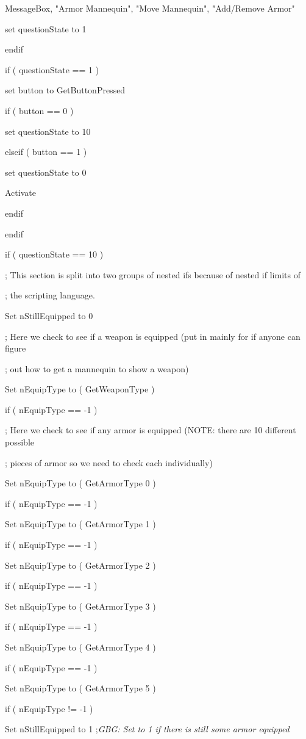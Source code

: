 \documentclass[
]{article}
\begin{document}
MessageBox, "Armor Mannequin", "Move Mannequin", "Add/Remove Armor"

set questionState to 1

endif

if ( questionState == 1 )

set button to GetButtonPressed

if ( button == 0 )

set questionState to 10

elseif ( button == 1 )

set questionState to 0

Activate

endif

endif

if ( questionState == 10 )

; This section is split into two groups of nested ifs because of nested
if limits of

; the scripting language.

Set nStillEquipped to 0

; Here we check to see if a weapon is equipped (put in mainly for if
anyone can figure

; out how to get a mannequin to show a weapon)

Set nEquipType to ( GetWeaponType )

if ( nEquipType == -1 )

; Here we check to see if any armor is equipped (NOTE: there are 10
different possible

; pieces of armor so we need to check each individually)

Set nEquipType to ( GetArmorType 0 )

if ( nEquipType == -1 )

Set nEquipType to ( GetArmorType 1 )

if ( nEquipType == -1 )

Set nEquipType to ( GetArmorType 2 )

if ( nEquipType == -1 )

Set nEquipType to ( GetArmorType 3 )

if ( nEquipType == -1 )

Set nEquipType to ( GetArmorType 4 )

if ( nEquipType == -1 )

Set nEquipType to ( GetArmorType 5 )

if ( nEquipType != -1 )

Set nStillEquipped to 1 ;\emph{GBG: Set to 1 if there is still some
armor equipped}
\end{document}

